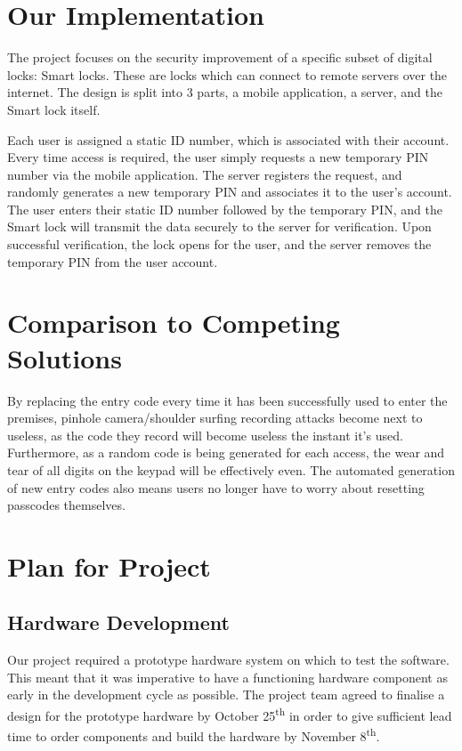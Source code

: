 \documentclass[conference]{IEEEtran}
\begin{document}
\section{Our Implementation}
	The project focuses on the security improvement of a specific subset of digital locks: Smart locks.
These are locks which can connect to remote servers over the internet.
The design is split into 3 parts, a mobile application, a server, and the Smart lock itself.

	Each user is assigned a static ID number, which is associated with their account.
Every time access is required, the user simply requests a new temporary PIN number via the mobile application.
The server registers the request, and randomly generates a new temporary PIN and associates it to the user's account.
The user enters their static ID number followed by the temporary PIN, and the Smart lock will transmit the data securely to the server for verification.
Upon successful verification, the lock opens for the user, and the server removes the temporary PIN from the user account.

\section{Comparison to Competing Solutions}
	By replacing the entry code every time it has been successfully used to enter the premises, pinhole camera/shoulder surfing recording attacks become next to useless, as the code they record will become useless the instant it’s used.
Furthermore, as a random code is being generated for each access, the wear and tear of all digits on the keypad will be effectively even.
The automated generation of new entry codes also means users no longer have to worry about resetting passcodes themselves.

\section{Plan for Project}
\subsection{Hardware Development}
	Our project required a prototype hardware system on which to test the software. This meant that it was imperative to have a functioning hardware component as early in the development cycle as possible. The project team agreed to finalise a design for the prototype hardware by October 25\textsuperscript{th} in order to give sufficient lead time to order components and build the hardware by November 8\textsuperscript{th}.
\end{document}
